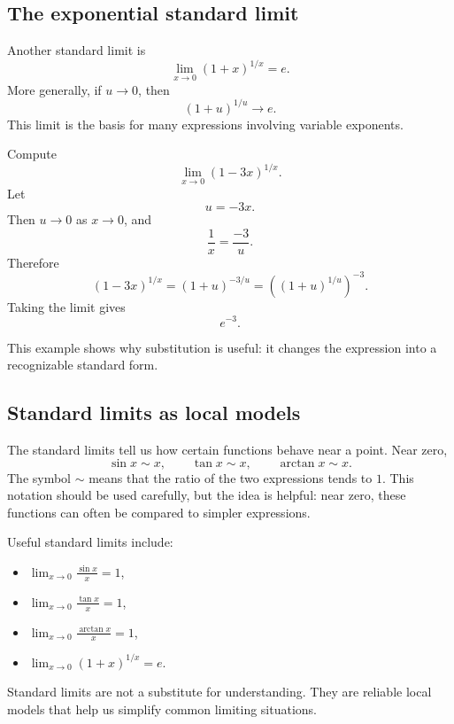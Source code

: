 \subsection*{The exponential standard limit}

Another standard limit is
\[
\lim_{x\to0}(1+x)^{1/x}=e.
\]
More generally, if \(u\to0\), then
\[
(1+u)^{1/u}\to e.
\]
This limit is the basis for many expressions involving variable exponents.

\begin{examplebox}
Compute
\[
\lim_{x\to0}(1-3x)^{1/x}.
\]
Let
\[
u=-3x.
\]
Then \(u\to0\) as \(x\to0\), and
\[
\frac1x=\frac{-3}{u}.
\]
Therefore
\[
(1-3x)^{1/x}=(1+u)^{-3/u}=\left((1+u)^{1/u}\right)^{-3}.
\]
Taking the limit gives
\[
e^{-3}.
\]
\end{examplebox}

This example shows why substitution is useful: it changes the expression into a recognizable standard form.

\subsection*{Standard limits as local models}

The standard limits tell us how certain functions behave near a point. Near zero,
\[
\sin x\sim x,
\qquad
\tan x\sim x,
\qquad
\arctan x\sim x.
\]
The symbol \(\sim\) means that the ratio of the two expressions tends to \(1\). This notation should be used carefully, but the idea is helpful: near zero, these functions can often be compared to simpler expressions.

\begin{summarybox}
Useful standard limits include:
\begin{itemize}
\item \(\displaystyle \lim_{x\to0}\frac{\sin x}{x}=1\),
\item \(\displaystyle \lim_{x\to0}\frac{\tan x}{x}=1\),
\item \(\displaystyle \lim_{x\to0}\frac{\arctan x}{x}=1\),
\item \(\displaystyle \lim_{x\to0}(1+x)^{1/x}=e\).
\end{itemize}
\end{summarybox}

Standard limits are not a substitute for understanding. They are reliable local models that help us simplify common limiting situations.